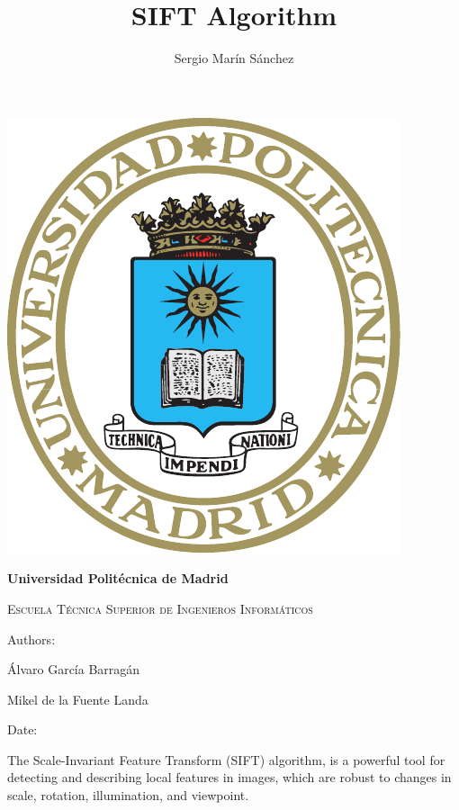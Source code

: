 \documentclass[12pt]{article}
\title{ SIFT Algorithm %
}
\author{ Sergio Marín Sánchez %
}
\begin{document}
\begin{titlepage}
    \centering
    \phantom{a}
    \vspace{2cm}
    {\includegraphics[scale=0.9]{ESCUDO_UPM.pdf}\par}
    \vspace{2cm}
    {\bfseries\LARGE Universidad Politécnica de Madrid \par}
    \vspace{0.75cm}
    {\scshape\Large Escuela Técnica Superior de Ingenieros Informáticos \par}
    \vspace{0.75cm}
    {\scshape\Huge \thetitle \par}
    \vfill
    {\large Authors: \par}
    {\large \theauthor \par } 
    {\large Álvaro García Barragán  \par }
    {\large Mikel de la Fuente Landa \par }
    \vspace{0.2cm}
    {\large Date:  \par}
\end{titlepage}

\setcounter{page}{1}

The Scale-Invariant Feature Transform (SIFT) algorithm, is a powerful tool for detecting and describing local features in images, which are robust to changes in scale, rotation, illumination, and viewpoint.
\end{document}
